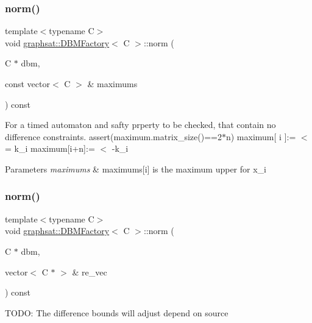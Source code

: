 \subsubsection{\texorpdfstring{norm()}{norm()}\hspace{0.1cm}{\footnotesize\ttfamily [1/4]}}
{\footnotesize\ttfamily template$<$typename C$>$ \\
void \mbox{\hyperlink{classgraphsat_1_1_d_b_m_factory}{graphsat\+::\+D\+B\+M\+Factory}}$<$ C $>$\+::norm (\begin{DoxyParamCaption}\item[{C $\ast$}]{dbm,  }\item[{const vector$<$ C $>$ \&}]{maximums }\end{DoxyParamCaption}) const\hspace{0.3cm}{\ttfamily [inline]}}

For a timed automaton and safty prperty to be checked, that contain no difference constraints. assert(maximum.\+matrix\+\_\+size()==2$\ast$n) maximum\mbox{[} i \mbox{]}\+:= $<$= k\+\_\+i maximum\mbox{[}i+n\mbox{]}\+:= $<$ -\/k\+\_\+i 
\begin{DoxyParams}{Parameters}
{\em maximums} & maximums\mbox{[}i\mbox{]} is the maximum upper for x\+\_\+i \\
\hline
\end{DoxyParams}
\mbox{\label{classgraphsat_1_1_d_b_m_factory_a9613b287aff6b6b48bfe1ed392a5eb16}} 
\subsubsection{\texorpdfstring{norm()}{norm()}\hspace{0.1cm}{\footnotesize\ttfamily [2/4]}}
{\footnotesize\ttfamily template$<$typename C$>$ \\
void \mbox{\hyperlink{classgraphsat_1_1_d_b_m_factory}{graphsat\+::\+D\+B\+M\+Factory}}$<$ C $>$\+::norm (\begin{DoxyParamCaption}\item[{C $\ast$}]{dbm,  }\item[{vector$<$ C $\ast$ $>$ \&}]{re\+\_\+vec }\end{DoxyParamCaption}) const\hspace{0.3cm}{\ttfamily [inline]}}

T\+O\+DO\+: The difference bounds will adjust depend on source


